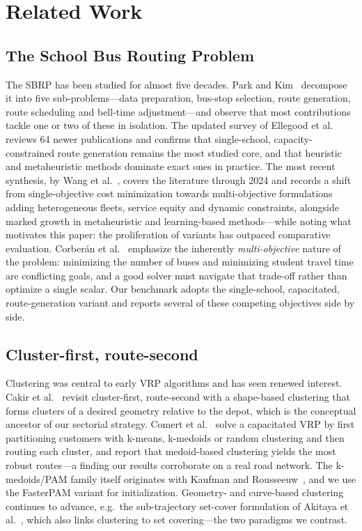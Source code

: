 \documentclass[runningheads]{llncs}
\begin{document}
\section{Related Work}\label{sec:related}
\subsection{The School Bus Routing Problem}
The SBRP has been studied for almost five decades. Park and
Kim~\cite{Park2010TheReview} decompose it into five sub-problems---data
preparation, bus-stop selection, route generation, route scheduling
and bell-time adjustment---and observe that most contributions tackle
one or two of these in isolation. The updated survey of Ellegood et
al.~\cite{Ellegood2020SchoolDirections} reviews 64 newer publications
and confirms that single-school, capacity-constrained route generation
remains the most studied core, and that heuristic and metaheuristic
methods dominate exact ones in practice. The most recent synthesis, by
Wang et al.~\cite{Wang2025SBRPReview}, covers the literature through
2024 and records a shift from single-objective cost minimization towards
multi-objective formulations adding heterogeneous fleets, service equity
and dynamic constraints, alongside marked growth in metaheuristic and
learning-based methods---while noting what motivates this paper: the
proliferation of variants has outpaced comparative evaluation.
Corber\'an et
al.~\cite{Corberan2002HeuristicObjectives} emphasize the inherently
\emph{multi-objective} nature of the problem: minimizing the number of
buses and minimizing student travel time are conflicting goals, and a
good solver must navigate that trade-off rather than optimize a single
scalar. Our benchmark adopts the single-school, capacitated, route-generation
variant and reports several of these competing objectives side by side.

\subsection{Cluster-first, route-second}
Clustering was central to early VRP algorithms and has seen renewed
interest. Cakir et al.~\cite{CakirRevisitingProblem} revisit
cluster-first, route-second with a shape-based clustering that forms
clusters of a desired geometry relative to the depot, which is the
conceptual ancestor of our sectorial strategy. Comert et
al.~\cite{Comert2018AStudy} solve a capacitated VRP by first
partitioning customers with k-means, k-medoids or random clustering
and then routing each cluster, and report that medoid-based clustering
yields the most robust routes---a finding our results corroborate on a
real road network. The k-medoids/PAM family itself originates with
Kaufman and Rousseeuw~\cite{KaufmanRousseeuw1990PAM}, and we use the
FasterPAM variant for initialization. Geometry- and curve-based
clustering continues to advance, e.g.\ the sub-trajectory set-cover
formulation of Akitaya et al.~\cite{Akitaya2021Subtrajectory}, which
also links clustering to set covering---the two paradigms we contrast.
\end{document}
